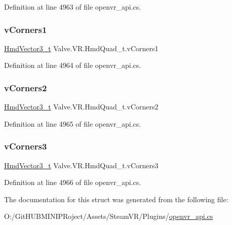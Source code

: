 Definition at line 4963 of file openvr\+\_\+api.\+cs.

\mbox{\label{struct_valve_1_1_v_r_1_1_hmd_quad__t_ab4707e8004066c071df0fb8875167c1b}} 
\subsubsection{\texorpdfstring{vCorners1}{vCorners1}}
{\footnotesize\ttfamily \mbox{\hyperlink{struct_valve_1_1_v_r_1_1_hmd_vector3__t}{Hmd\+Vector3\+\_\+t}} Valve.\+V\+R.\+Hmd\+Quad\+\_\+t.\+v\+Corners1}



Definition at line 4964 of file openvr\+\_\+api.\+cs.

\mbox{\label{struct_valve_1_1_v_r_1_1_hmd_quad__t_afc6fa226f980e5c5e5a997c4d9917a6a}} 
\subsubsection{\texorpdfstring{vCorners2}{vCorners2}}
{\footnotesize\ttfamily \mbox{\hyperlink{struct_valve_1_1_v_r_1_1_hmd_vector3__t}{Hmd\+Vector3\+\_\+t}} Valve.\+V\+R.\+Hmd\+Quad\+\_\+t.\+v\+Corners2}



Definition at line 4965 of file openvr\+\_\+api.\+cs.

\mbox{\label{struct_valve_1_1_v_r_1_1_hmd_quad__t_a3facb7a3d1900d2b85bd1260f99b08ee}} 
\subsubsection{\texorpdfstring{vCorners3}{vCorners3}}
{\footnotesize\ttfamily \mbox{\hyperlink{struct_valve_1_1_v_r_1_1_hmd_vector3__t}{Hmd\+Vector3\+\_\+t}} Valve.\+V\+R.\+Hmd\+Quad\+\_\+t.\+v\+Corners3}



Definition at line 4966 of file openvr\+\_\+api.\+cs.



The documentation for this struct was generated from the following file\+:\begin{DoxyCompactItemize}
\item 
O\+:/\+Git\+H\+U\+B\+M\+I\+N\+I\+P\+Roject/\+Assets/\+Steam\+V\+R/\+Plugins/\mbox{\hyperlink{openvr__api_8cs}{openvr\+\_\+api.\+cs}}\end{DoxyCompactItemize}
